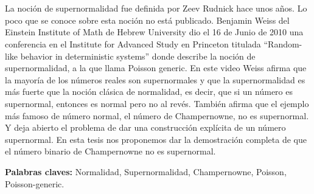 \chapter*{\runtitulo}


La noción de supernormalidad fue definida por Zeev Rudnick hace unos años. Lo poco que se conoce sobre esta noción no está publicado. Benjamin
Weiss del Einstein Institute of Math de Hebrew University dio el 16 de Junio de 2010 una
conferencia en el Institute for Advanced Study en Princeton titulada “Random-like behavior
in deterministic systems” donde describe la noción de supernormalidad, a la que llama Poisson
generic. En este video Weiss afirma que la mayoría de los números reales son supernormales y que la supernormalidad es más fuerte que la noción clásica de normalidad, es decir, que si un número es supernormal, entonces es normal pero no al revés.
También afirma que el ejemplo más famoso de número normal, el número de Champernowne, no es supernormal. Y deja abierto
el problema de dar una construcción explícita de un número supernormal.
En esta tesis nos proponemos dar la demostración completa de que el número binario de
Champernowne no es supernormal.


\bigskip

\noindent\textbf{Palabras claves:} Normalidad, Supernormalidad, Champernowne, Poisson, Poisson-generic.